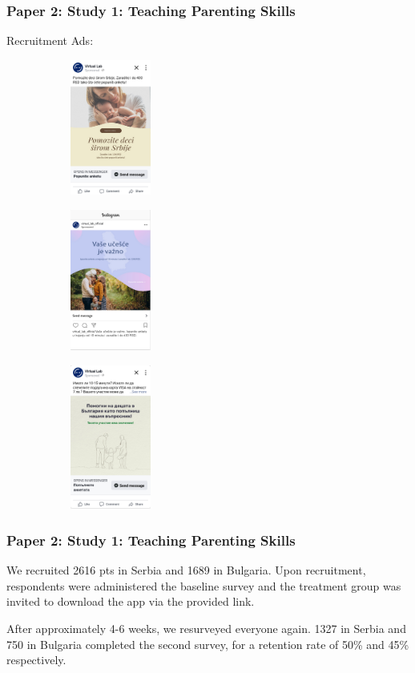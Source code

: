 \documentclass[aspectratio=169]{beamer}
\begin{document}
\begin{frame}
\frametitle{Paper 2: Study 1: Teaching Parenting Skills}
Recruitment Ads: 

\begin{figure}
\begin{subfigure}{}
\includegraphics[width=100px]{resources/recruitment/558.png} 
\end{subfigure}
\begin{subfigure}{}
\includegraphics[width=100px]{resources/recruitment/639.png} 
\end{subfigure}
\begin{subfigure}{}
\includegraphics[width=100px]{resources/recruitment/742.png} 
\end{subfigure}

\end{figure}

\end{frame}

\begin{frame}
  \frametitle{Paper 2: Study 1: Teaching Parenting Skills}

We recruited 2616 pts in Serbia and 1689 in Bulgaria. Upon recruitment, respondents were administered the baseline survey and the treatment group was invited to download the app via the provided link. 

After approximately 4-6 weeks, we resurveyed everyone again. 1327 in Serbia and 750 in Bulgaria completed the second survey, for a retention rate of 50\% and 45\% respectively. 

\end{frame}
\end{document}
